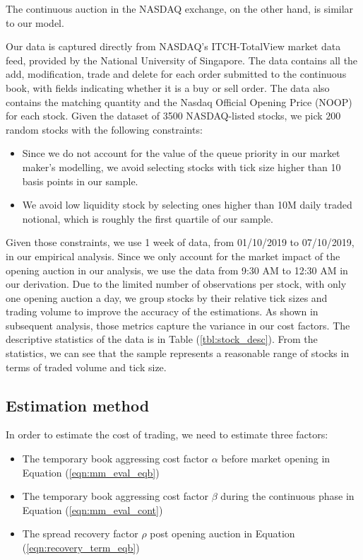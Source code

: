The continuous auction in the NASDAQ exchange, on the other hand, is similar to our model.

Our data is captured directly from NASDAQ's ITCH-TotalView market data feed, provided by the National University of Singapore. The data contains all the add, modification, trade and delete for each order submitted to the continuous book, with fields indicating whether it is a buy or sell order. The data also contains the matching quantity and the Nasdaq Official Opening Price (NOOP) for each stock. Given the dataset of 3500 NASDAQ-listed stocks, we pick $200$ random stocks with the following constraints:
\begin{itemize}
  \item Since we do not account for the value of the queue priority in our market maker's modelling, we avoid selecting stocks with tick size higher than 10 basis points in our sample.
  \item We avoid low liquidity stock by selecting ones higher than 10M daily traded notional, which is roughly the first quartile of our sample.
\end{itemize}

Given those constraints, we use 1 week of data, from 01/10/2019 to 07/10/2019, in our empirical analysis. Since we only account for the market impact of the opening auction in our analysis, we use the data from 9:30 AM to 12:30 AM in our derivation. Due to the limited number of observations per stock, with only one opening auction a day, we group stocks by their relative tick sizes and trading volume to improve the accuracy of the estimations. As shown in subsequent analysis, those metrics capture the variance in our cost factors. The descriptive statistics of the data is in Table (\ref{tbl:stock_desc}). From the statistics, we can see that the sample represents a reasonable range of stocks in terms of traded volume and tick size.



\subsection{Estimation method}
In order to estimate the cost of trading, we need to estimate three factors:

\begin{itemize}
  \item The temporary book aggressing cost factor $\alpha$ before market opening in Equation (\ref{eqn:mm_eval_eqb})
  \item The temporary book aggressing cost factor $\beta$ during the continuous phase in Equation (\ref{eqn:mm_eval_cont})
  \item The spread recovery factor $\rho$ post opening auction in Equation (\ref{eqn:recovery_term_eqb})
\end{itemize}

